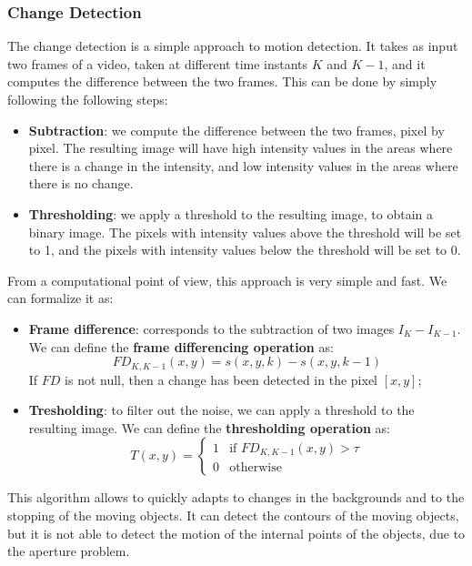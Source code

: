 \subsubsection{Change Detection}
The change detection is a simple approach to motion detection. It takes as input two frames of a video, taken at different time instants $K$ and $K-1$, 
and it computes the difference between the two frames. This can be done by simply following the following steps:
\begin{itemize}
    \item \textbf{Subtraction}: we compute the difference between the two frames, pixel by pixel.
    The resulting image will have high intensity values in the areas where there is a change in the intensity, and low intensity values in the areas where there is no change.
    \item \textbf{Thresholding}: we apply a threshold to the resulting image, to obtain a binary image. The pixels with intensity values above the threshold
    will be set to 1, and the pixels with intensity values below the threshold will be set to 0.
\end{itemize}
From a computational point of view, this approach is very simple and fast. We can formalize it as:
\begin{itemize}
    \item \textbf{Frame difference}: corresponds to the subtraction of two images $I_K - I_{K-1}$.
    We can define the \textbf{frame differencing operation} as:
    \begin{equation}
    \label{eq:frame_difference}
        FD_{K, K-1}(x, y) = s(x, y, k) - s(x, y, k-1)
    \end{equation}
    If $FD$ is not null, then a change has been detected in the pixel $[x, y]$;
    \item \textbf{Tresholding}: to filter out the noise, we can apply a threshold to the resulting image. We can define the \textbf{thresholding operation} as:
    \begin{equation}    
        \label{eq:thresholding}
        T(x, y) = \begin{cases}
            1 & \text{if } FD_{K, K-1}(x, y) > \tau \\
            0 & \text{otherwise}
        \end{cases}
    \end{equation}
\end{itemize}
This algorithm allows to quickly adapts to changes in the backgrounds and to the stopping of the moving objects.
It can detect the contours of the moving objects, but it is not able to detect the motion of the internal points of the objects, due to the aperture problem.

